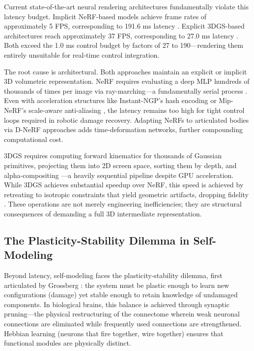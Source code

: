\documentclass[12pt,a4paper,oneside]{report}
\begin{document}
Current state-of-the-art neural rendering architectures fundamentally violate this latency budget. Implicit NeRF-based models achieve frame rates of approximately 5 FPS, corresponding to 191.6 ms latency \cite{hu2024teaching}. Explicit 3DGS-based architectures reach approximately 37 FPS, corresponding to 27.0 ms latency \cite{hu2025learning}. Both exceed the 1.0 ms control budget by factors of 27 to 190—rendering them entirely unsuitable for real-time control integration.

The root cause is architectural. Both approaches maintain an explicit or implicit 3D volumetric representation. NeRF requires evaluating a deep MLP hundreds of thousands of times per image via ray-marching—a fundamentally serial process \cite{mildenhall2020nerf}. Even with acceleration structures like Instant-NGP's hash encoding \cite{muller2022instant} or Mip-NeRF's scale-aware anti-aliasing \cite{barron2021mip}, the latency remains too high for tight control loops required in robotic damage recovery. Adapting NeRFs to articulated bodies via D-NeRF approaches \cite{pumarola2021d} adds time-deformation networks, further compounding computational cost.

3DGS requires computing forward kinematics for thousands of Gaussian primitives, projecting them into 2D screen space, sorting them by depth, and alpha-compositing \cite{kerbl20233d}—a heavily sequential pipeline despite GPU acceleration. While 3DGS achieves substantial speedup over NeRF, this speed is achieved by retreating to isotropic constraints that yield geometric artifacts, dropping fidelity \cite{hu2025learning}. These operations are not merely engineering inefficiencies; they are structural consequences of demanding a full 3D intermediate representation.

\subsection{The Plasticity-Stability Dilemma in Self-Modeling}
\label{subsec:plasticity_stability}

Beyond latency, self-modeling faces the plasticity-stability dilemma, first articulated by Grossberg \cite{grossberg1987competitive}: the system must be plastic enough to learn new configurations (damage) yet stable enough to retain knowledge of undamaged components. In biological brains, this balance is achieved through synaptic pruning—the physical restructuring of the connectome wherein weak neuronal connections are eliminated while frequently used connections are strengthened. Hebbian learning (neurons that fire together, wire together) ensures that functional modules are physically distinct.
\end{document}
